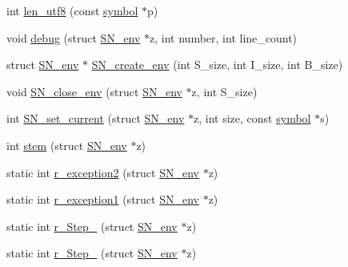 \begin{DoxyCompactItemize}
\item 
int \mbox{\hyperlink{namespaceirk_1_1porter2_a0c385d7161e7bb475ab2a84e6323ec96}{len\+\_\+utf8}} (const \mbox{\hyperlink{namespaceirk_1_1porter2_afd04c4eb58a1dabcf8f3ab2d7e9f9ed5}{symbol}} $\ast$p)
\item 
void \mbox{\hyperlink{namespaceirk_1_1porter2_a67c11f4c80bba50ebd7decdadc48f0a8}{debug}} (struct \mbox{\hyperlink{structirk_1_1porter2_1_1SN__env}{S\+N\+\_\+env}} $\ast$z, int number, int line\+\_\+count)
\item 
struct \mbox{\hyperlink{structirk_1_1porter2_1_1SN__env}{S\+N\+\_\+env}} $\ast$ \mbox{\hyperlink{namespaceirk_1_1porter2_a29b32bb3ac8583efe1be43a09669b342}{S\+N\+\_\+create\+\_\+env}} (int S\+\_\+size, int I\+\_\+size, int B\+\_\+size)
\item 
void \mbox{\hyperlink{namespaceirk_1_1porter2_ad8c3354818744ae1353046f723e87366}{S\+N\+\_\+close\+\_\+env}} (struct \mbox{\hyperlink{structirk_1_1porter2_1_1SN__env}{S\+N\+\_\+env}} $\ast$z, int S\+\_\+size)
\item 
int \mbox{\hyperlink{namespaceirk_1_1porter2_a2fa559b7a66293313318c98354f25d4f}{S\+N\+\_\+set\+\_\+current}} (struct \mbox{\hyperlink{structirk_1_1porter2_1_1SN__env}{S\+N\+\_\+env}} $\ast$z, int size, const \mbox{\hyperlink{namespaceirk_1_1porter2_afd04c4eb58a1dabcf8f3ab2d7e9f9ed5}{symbol}} $\ast$s)
\item 
int \mbox{\hyperlink{namespaceirk_1_1porter2_aa82a4b68c7020a6a1855687ea5b2da74}{stem}} (struct \mbox{\hyperlink{structirk_1_1porter2_1_1SN__env}{S\+N\+\_\+env}} $\ast$z)
\item 
static int \mbox{\hyperlink{namespaceirk_1_1porter2_aaaba4a52e8c4a6a540a7161013ec44ca}{r\+\_\+exception2}} (struct \mbox{\hyperlink{structirk_1_1porter2_1_1SN__env}{S\+N\+\_\+env}} $\ast$z)
\item 
static int \mbox{\hyperlink{namespaceirk_1_1porter2_a81386f566b59d0cbb9461e5bcef84837}{r\+\_\+exception1}} (struct \mbox{\hyperlink{structirk_1_1porter2_1_1SN__env}{S\+N\+\_\+env}} $\ast$z)
\item 
static int \mbox{\hyperlink{namespaceirk_1_1porter2_a01384e21bcfa554421f5a1d15640fa2b}{r\+\_\+\+Step\+\_}} (struct \mbox{\hyperlink{structirk_1_1porter2_1_1SN__env}{S\+N\+\_\+env}} $\ast$z)
\item 
static int \mbox{\hyperlink{namespaceirk_1_1porter2_aa13542ef8b501952389b0192e7e49f53}{r\+\_\+\+Step\+\_}} (struct \mbox{\hyperlink{structirk_1_1porter2_1_1SN__env}{S\+N\+\_\+env}} $\ast$z)
\item 

\end{DoxyCompactItemize}
